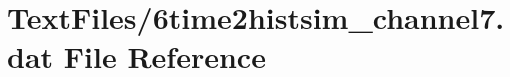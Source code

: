 \hypertarget{6time2histsim__channel7_8dat}{}\section{Text\+Files/6time2histsim\+\_\+channel7.dat File Reference}
\label{6time2histsim__channel7_8dat}

